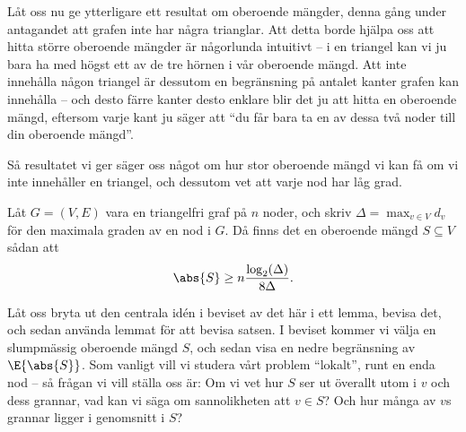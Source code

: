 \documentclass[nobib]{tufte-handout}
\begin{document}
Låt oss nu ge ytterligare ett resultat om oberoende mängder, denna gång under antagandet att grafen inte har några trianglar. Att detta borde hjälpa oss att hitta större oberoende mängder är någorlunda intuitivt -- i en triangel kan vi ju bara ha med högst ett av de tre hörnen i vår oberoende mängd. Att inte innehålla någon triangel är dessutom en begränsning på antalet kanter grafen kan innehålla 
-- och desto färre kanter desto enklare blir det ju att hitta en oberoende mängd, eftersom varje kant ju säger att ``du får bara ta en av dessa två noder till din oberoende mängd''.

Så resultatet vi ger säger oss något om hur stor oberoende mängd vi kan få om vi inte innehåller en triangel, och dessutom vet att varje nod har låg grad.

\begin{theorem}\label{thm:shearer_triangle_free_indep_set}
  Låt $G = (V, E)$ vara en triangelfri graf på $n$ noder, och skriv $\Delta = \max_{v \in V} d_v$ för den maximala graden av en nod i $G$. Då finns det en oberoende mängd $S \subseteq V$ sådan att
  $$\abs{S} \geq n\frac{\log_2(\Delta)}{8\Delta}.$$
\end{theorem}

Låt oss bryta ut den centrala idén i beviset av det här i ett lemma, bevisa det, och sedan använda lemmat för att bevisa satsen. I beviset kommer vi välja en slumpmässig oberoende mängd $S$, och sedan visa en nedre begränsning av $\E{\abs{S}}$. Som vanligt vill vi studera vårt problem ``lokalt'', runt en enda nod -- så frågan vi vill ställa oss är: Om vi vet hur $S$ ser ut överallt utom i $v$ och dess grannar, vad kan vi säga om sannolikheten att $v \in S$? Och hur många av $v$s grannar ligger i genomsnitt i $S$?
\end{document}
